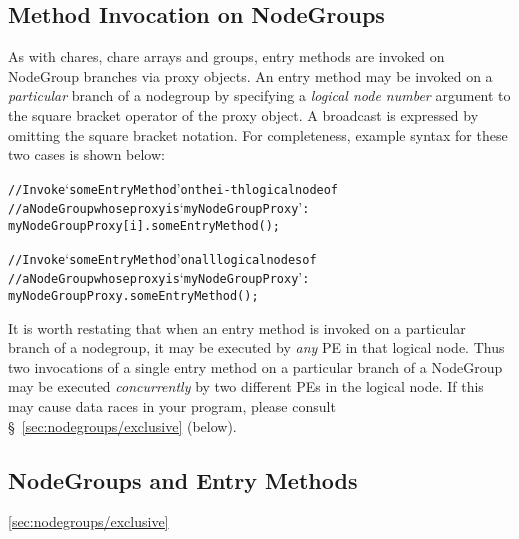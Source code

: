 \subsection{Method Invocation on NodeGroups}

As with chares, chare arrays and groups, entry methods are invoked on
NodeGroup branches via proxy objects. 
An entry method may be invoked on a {\em particular} branch of a
nodegroup by specifying a {\em logical node number} argument
to the square bracket operator of the proxy object. A broadcast is expressed
by omitting the square bracket notation. For completeness, example syntax for these
two cases is shown below:

\begin{alltt}
 // Invoke `someEntryMethod' on the i-th logical node of
 // a NodeGroup whose proxy is `myNodeGroupProxy':
 myNodeGroupProxy[i].someEntryMethod();

 // Invoke `someEntryMethod' on all logical nodes of
 // a NodeGroup whose proxy is `myNodeGroupProxy':
 myNodeGroupProxy.someEntryMethod();
\end{alltt}

It is worth restating that when an entry method is
invoked on a particular branch of a nodegroup,
it may be executed by {\em any} PE in that logical node. Thus two invocations of
a single entry method on a particular branch of a
NodeGroup may be executed {\em concurrently} by two
different PEs in the logical node. If this may cause data races in your
program, please consult \S~\ref{sec:nodegroups/exclusive} (below).


\subsection{NodeGroups and  Entry Methods}
\ref{sec:nodegroups/exclusive}

